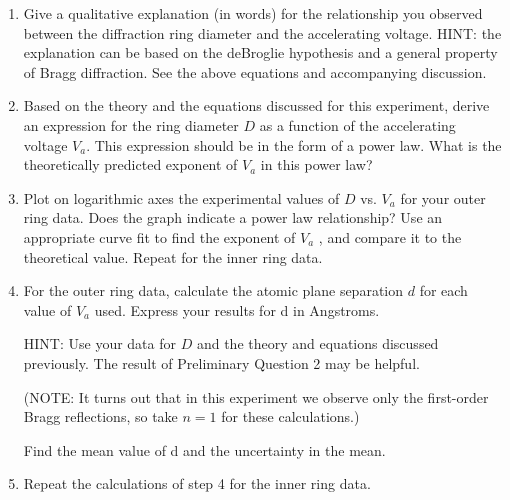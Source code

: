 \documentclass{article}
\begin{document}
\begin{enumerate}
\item Give a qualitative explanation (in words) for the relationship you
observed between the diffraction ring diameter and the accelerating
voltage.  HINT:  the explanation can be based on the deBroglie
hypothesis and a general property of Bragg diffraction.  See the above
equations and accompanying discussion.

\item Based on the theory and the equations discussed for this experiment,
derive an expression for the ring diameter $D$ as a function of the accelerating voltage
$V_a$. This expression should be in the form of a power
law.  What is the theoretically predicted exponent of
$V_a$ in this power law?

\item Plot on logarithmic axes the experimental values of $D$ vs.
$V_a$ for your outer ring data. Does the graph indicate a power law relationship?  Use an appropriate curve
fit to find the exponent of $V_a$ , and compare it to the
theoretical value.  Repeat for the inner ring data.

\item For the outer ring data, calculate the atomic plane separation $d$ for
each value of $V_a$ used. Express your results for d in Angstroms.

HINT: Use your data for $D$ and the theory and equations discussed
previously.  The result of Preliminary Question 2 may be helpful.

(NOTE: It turns out that in this experiment we observe only the
first-order Bragg reflections, so take $n = 1$ for these calculations.)

Find the mean value of d and the uncertainty in the mean.

\item Repeat the calculations of step 4 for the inner ring data.


\end{enumerate}
\end{document}
